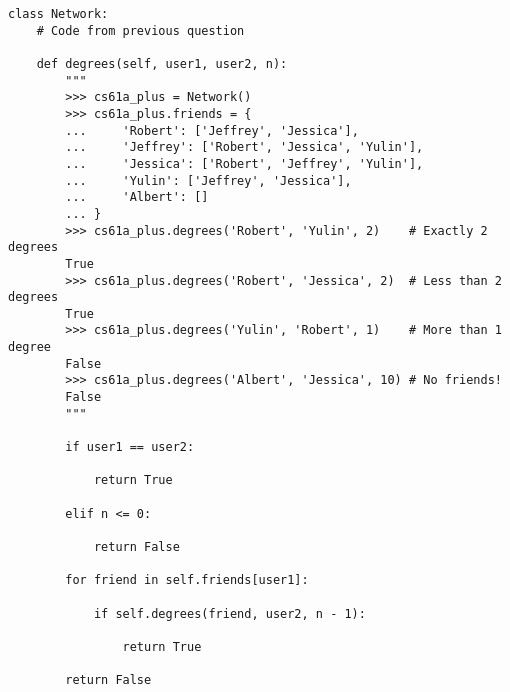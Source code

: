 \begin{solution}
\begin{lstlisting}
class Network:
    # Code from previous question

    def degrees(self, user1, user2, n):
        """
        >>> cs61a_plus = Network()
        >>> cs61a_plus.friends = {
        ...     'Robert': ['Jeffrey', 'Jessica'],
        ...     'Jeffrey': ['Robert', 'Jessica', 'Yulin'],
        ...     'Jessica': ['Robert', 'Jeffrey', 'Yulin'],
        ...     'Yulin': ['Jeffrey', 'Jessica'],
        ...     'Albert': []
        ... }
        >>> cs61a_plus.degrees('Robert', 'Yulin', 2)    # Exactly 2 degrees
        True
        >>> cs61a_plus.degrees('Robert', 'Jessica', 2)  # Less than 2 degrees
        True
        >>> cs61a_plus.degrees('Yulin', 'Robert', 1)    # More than 1 degree
        False
        >>> cs61a_plus.degrees('Albert', 'Jessica', 10) # No friends!
        False
        """

        if user1 == user2:

            return True

        elif n <= 0:

            return False

        for friend in self.friends[user1]:

            if self.degrees(friend, user2, n - 1):

                return True

        return False

\end{lstlisting}
\end{solution}
